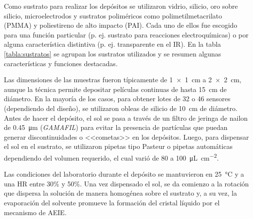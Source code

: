			Como sustrato para realizar los depósitos se utilizaron vidrio, silicio, oro sobre silicio, microelectrodos y sustratos poliméricos como  polimetilmetacrilato (PMMA) y poliestireno de alto impacto (PAI). Cada uno de ellos fue escogido para una función particular (p. ej. sustrato para reacciones electroquímicas) o por alguna característica distintiva (p. ej. transparente en el IR). En la tabla \ref{tabla:sustratos} se agrupan los sustratos utilizados y se resumen algunas características y funciones destacadas.

			Las dimensiones de las muestras fueron típicamente de \SI{1x1}{\cm} a \linebreak \SI{2x2}{\cm}, aunque la técnica permite depositar películas continuas de hasta \SI{15}{cm} de diámetro. En la mayoría de los casos, para obtener lotes de 32 o 46 sensores (dependiendo del diseño), se utilizaron obleas de silicio de \SI{10}{\cm} de diámetro. Antes de hacer el depósito, el sol se pasa a través de un filtro de jeringa de nailon de \SI{0.45}{\um} (\textit{GAMAFIL}) para evitar la presencia de partículas que puedan generar discontinuidades o <<cometas>> en los depósitos\cite{Franssila2004}. Luego, para dispensar el sol en el sustrato, se utilizaron pipetas tipo Pasteur o pipetas automáticas dependiendo del volumen requerido, el cual varió de 80 a \SI{100}{\uL.\cm^{-2}}. 

			Las condiciones del laboratorio durante el depósito se mantuvieron en \SI{25}{\celsius} y a una HR entre 30\% y 50\%. Una vez dispensado el sol, se da comienzo a la rotación que dispersa la solución de manera homogénea sobre el sustrato y, a su vez, la evaporación del solvente promueve la formación del cristal líquido por el mecanismo de AEIE\cite{Brinker1999}.


